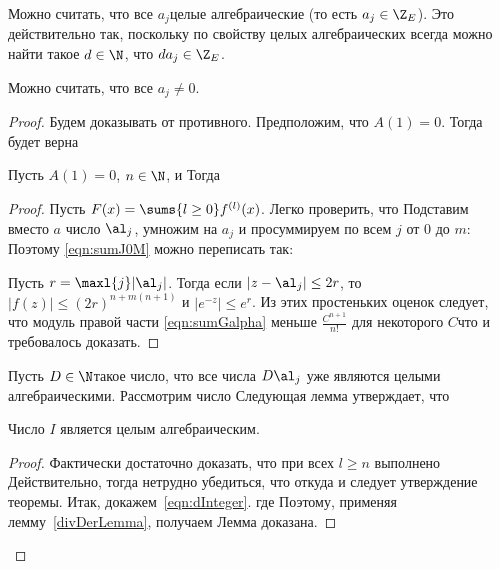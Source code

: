 \documentclass[a4paper]{article}
\begin{document}
 Можно считать, что все $a_j$\т  целые алгебраические (то есть $a_j \in \Z_E$). Это действительно так,
поскольку по свойству целых алгебраических всегда можно найти такое $d\in\N$, что $da_j\in\Z_E$.

 Можно считать, что все $a_j\neq0$.

\begin{proof}
Будем доказывать от противного. Предположим, что $A(1)=0$. Тогда будет верна
\begin{lemma}\label{lem:seriesAtOneZero}
Пусть $A(1)=0$, $n\in\N$,  и
Тогда
\end{lemma}
\begin{proof}
Пусть $F(x)=\sums{l\ge0}f^{(l)}(x)$. Легко проверить, что
Подставим вместо $a$ число $\al_j$, умножим на $a_j$ и просуммируем по всем $j$ от $0$ до $m$:
Поэтому \eqref{eqn:sumJ0M} можно переписать так:

Пусть $r=\maxl{j}|\al_j|$. Тогда если $|z-\al_j|\le 2r$, то $|f(z)|\le(2r)^{n+m(n+1)}$ и $|e^{-z}|\le
e^r$. Из этих простеньких оценок следует, что модуль правой части \eqref{eqn:sumGalpha} меньше $\frac{C^{n+1}}{n!}$ для
некоторого $C$\т  что и требовалось доказать.
\end{proof}


Пусть $D\in\N$\т такое число, что все числа $D\al_j$ уже являются целыми алгебраическими. Рассмотрим число
Следующая лемма утверждает, что

\begin{lemma}
Число $I$ является целым алгебраическим.
\end{lemma}
\begin{proof}
Фактически достаточно доказать, что при всех $l\ge n$ выполнено
Действительно, тогда нетрудно убедиться, что
откуда и следует утверждение теоремы. Итак, докажем~\eqref{eqn:dInteger}.
где
Поэтому, применяя лемму~\ref{divDerLemma}, получаем
Лемма доказана.
\end{proof}


\end{proof}
\end{document}
